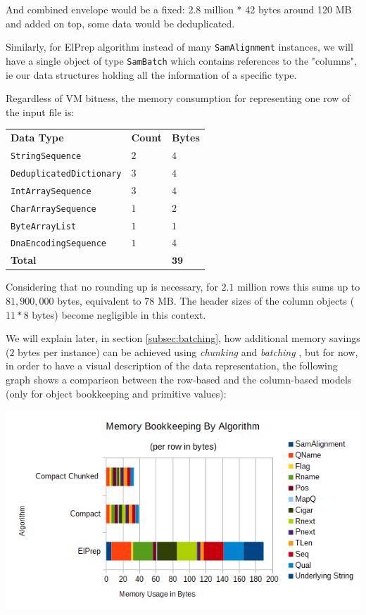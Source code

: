 \documentclass[a4paper,twoside]{article}
\begin{document}
And combined envelope would be a fixed: 2.8 million * 42 bytes around 120 MB and added on top, some data would be deduplicated.

Similarly, for ElPrep algorithm instead of many {\texttt{SamAlignment}} instances, we will have a single object of type {\texttt{SamBatch}} which contains references to the "columns", ie our data structures holding all the information of a specific type.


Regardless of VM bitness, the memory consumption for representing one row of the input file is: 
\begin{center}
\begin{tabular}{ l l l }
 {\textbf{Data Type}} 				& {\textbf{Count}} 		& {\textbf{Bytes}} \\
 {\texttt{StringSequence}} 		    & $2$ 				& $4$ \\
 {\texttt{DeduplicatedDictionary}}	& $3$ 				& $4$ \\
 {\texttt{IntArraySequence}}		& $3$		 		& $4$ \\
 {\texttt{CharArraySequence}}		& $1$				& $2$ \\
 {\texttt{ByteArrayList}}			& $1$				& $1$ \\
 {\texttt{DnaEncodingSequence}}	    & $1$ 				& $4$ \\
 {\textbf{Total}}					& 					& $\mathbf{39}$
\end{tabular}
\end{center}

Considering that no rounding up is necessary, for $2.1$ million rows this sums up to $81,900,000$ bytes,
equivalent to $78$ MB. The header sizes of the column objects ($11*8$ bytes) become negligible in this context.

We will explain later, in section \ref{subsec:batching}, how additional memory savings ($2$ bytes per instance) can be achieved using {\textit{chunking} } and {\textit{batching} }, but for now, in order to have a visual description of the data representation, the following graph shows a comparison between the row-based and the column-based models (only for object bookkeeping and primitive values):

\begin{center}
	\includegraphics[scale=0.35]{images/MemoryBookeeping.png}
\end{center}
\end{document}
